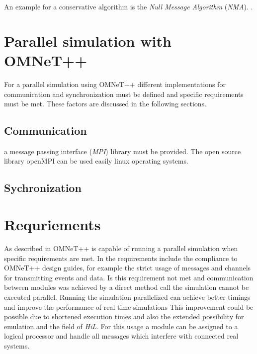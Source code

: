 An example for a conservative algorithm is the \emph{Null Message Algorithm} (\emph{NMA}). \cite[section 2.1]{bagrodia_performance_2000} \cite{Varga03apractical}.

\section{Parallel simulation with OMNeT++}
\label{sec:parallel_omnet}

For a parallel simulation using OMNeT++ different implementations for communication and synchronization must be defined and specific requirements must be met.
These factors are discussed in the following sections.

\subsection{Communication}
\label{sec:parallel_omnet_comm}

a message passing interface (\emph{MPI}) library must be provided.
The open source library openMPI can be used easily linux operating systems.


\subsection{Sychronization}
\label{sec:parallel_omnet_sync}

\section{Requriements}
\label{sec:parallel_omnet_requirements}

As described in \cite{varga_parallel_2003} OMNeT++ is capable of running a parallel simulation when specific requirements are met.
In \cite{varga_parallel_2003} the requirements include the compliance to OMNeT++ design guides, for example the strict usage of messages and channels for transmitting events and data.
Is this requirement not met and communication between modules was achieved by a direct method call the simulation cannot be executed parallel.
Running the simulation parallelized can achieve better timings and improve the performance of real time simulations
This improvement could be possible due to shortened execution times and also the extended possibility for emulation and the field of \emph{HiL}.
For this usage a module can be assigned to a logical processor and handle all messages which interfere with connected real systems.